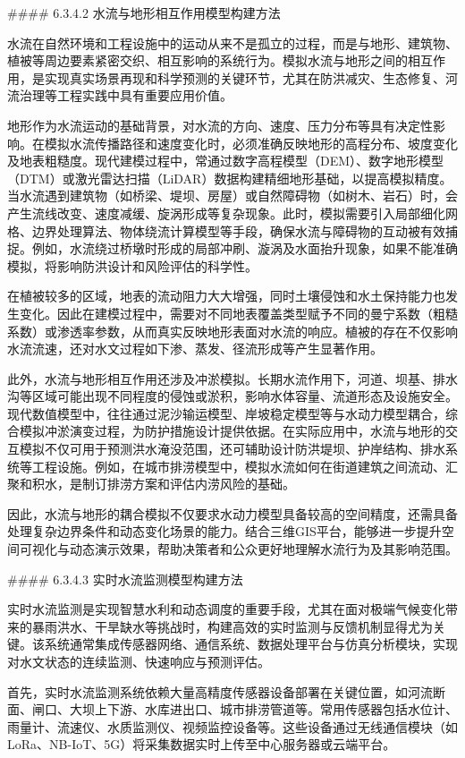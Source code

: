 \#\#\#\# 6.3.4.2 水流与地形相互作用模型构建方法

水流在自然环境和工程设施中的运动从来不是孤立的过程，而是与地形、建筑物、植被等周边要素紧密交织、相互影响的系统行为。模拟水流与地形之间的相互作用，是实现真实场景再现和科学预测的关键环节，尤其在防洪减灾、生态修复、河流治理等工程实践中具有重要应用价值。

地形作为水流运动的基础背景，对水流的方向、速度、压力分布等具有决定性影响。在模拟水流传播路径和速度变化时，必须准确反映地形的高程分布、坡度变化及地表粗糙度。现代建模过程中，常通过数字高程模型（DEM）、数字地形模型（DTM）或激光雷达扫描（LiDAR）数据构建精细地形基础，以提高模拟精度。当水流遇到建筑物（如桥梁、堤坝、房屋）或自然障碍物（如树木、岩石）时，会产生流线改变、速度减缓、旋涡形成等复杂现象。此时，模拟需要引入局部细化网格、边界处理算法、物体绕流计算模型等手段，确保水流与障碍物的互动被有效捕捉。例如，水流绕过桥墩时形成的局部冲刷、漩涡及水面抬升现象，如果不能准确模拟，将影响防洪设计和风险评估的科学性。

在植被较多的区域，地表的流动阻力大大增强，同时土壤侵蚀和水土保持能力也发生变化。因此在建模过程中，需要对不同地表覆盖类型赋予不同的曼宁系数（粗糙系数）或渗透率参数，从而真实反映地形表面对水流的响应。植被的存在不仅影响水流流速，还对水文过程如下渗、蒸发、径流形成等产生显著作用。

此外，水流与地形相互作用还涉及冲淤模拟。长期水流作用下，河道、坝基、排水沟等区域可能出现不同程度的侵蚀或淤积，影响水体容量、流道形态及设施安全。现代数值模型中，往往通过泥沙输运模型、岸坡稳定模型等与水动力模型耦合，综合模拟冲淤演变过程，为防护措施设计提供依据。在实际应用中，水流与地形的交互模拟不仅可用于预测洪水淹没范围，还可辅助设计防洪堤坝、护岸结构、排水系统等工程设施。例如，在城市排涝模型中，模拟水流如何在街道建筑之间流动、汇聚和积水，是制订排涝方案和评估内涝风险的基础。

因此，水流与地形的耦合模拟不仅要求水动力模型具备较高的空间精度，还需具备处理复杂边界条件和动态变化场景的能力。结合三维GIS平台，能够进一步提升空间可视化与动态演示效果，帮助决策者和公众更好地理解水流行为及其影响范围。

\#\#\#\# 6.3.4.3 实时水流监测模型构建方法

实时水流监测是实现智慧水利和动态调度的重要手段，尤其在面对极端气候变化带来的暴雨洪水、干旱缺水等挑战时，构建高效的实时监测与反馈机制显得尤为关键。该系统通常集成传感器网络、通信系统、数据处理平台与仿真分析模块，实现对水文状态的连续监测、快速响应与预测评估。

首先，实时水流监测系统依赖大量高精度传感器设备部署在关键位置，如河流断面、闸口、大坝上下游、水库进出口、城市排涝管道等。常用传感器包括水位计、雨量计、流速仪、水质监测仪、视频监控设备等。这些设备通过无线通信模块（如LoRa、NB-IoT、5G）将采集数据实时上传至中心服务器或云端平台。

